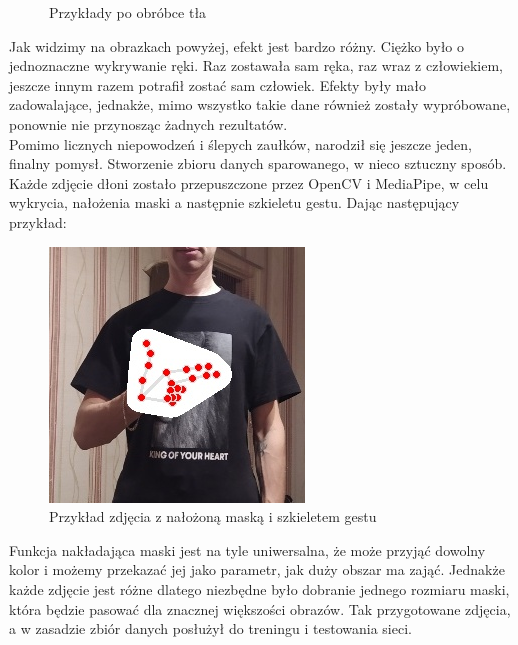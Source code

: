 \documentclass[12pt]{article}
\begin{document}
\begin{sloppypar}
{{\begin{figure}
\begin{subfigure}{.5\textwidth}
        \label{fig:blurred}
      \end{subfigure}
      \caption{Przykłady po obróbce tła}
      \label{fig:blurred-pre}
    \end{figure}
    Jak widzimy na obrazkach powyżej, efekt jest bardzo różny. Ciężko było o jednoznaczne wykrywanie ręki. 
    Raz zostawała sam ręka, raz wraz z człowiekiem, jeszcze innym razem potrafił zostać sam człowiek. 
    Efekty były mało zadowalające, jednakże, mimo wszystko takie dane również zostały wypróbowane, ponownie nie przynosząc żadnych rezultatów. \\
    Pomimo licznych niepowodzeń i ślepych zaułków, narodził się jeszcze jeden, finalny pomysł. Stworzenie zbioru danych sparowanego, w nieco sztuczny sposób.
    Każde zdjęcie dłoni zostało przepuszczone przez OpenCV i MediaPipe, w celu wykrycia, nałożenia maski a następnie szkieletu gestu. Dając następujący przykład:
    \begin{figure}[H]
      \centering
      \includegraphics{no_hand.jpg}
      \caption{Przykład zdjęcia z nałożoną maską i szkieletem gestu}
      \label{fig:mask}
    \end{figure}
    Funkcja nakładająca maski jest na tyle uniwersalna, że może przyjąć dowolny kolor i możemy przekazać jej jako parametr, jak duży obszar ma zająć. 
    Jednakże każde zdjęcie jest różne dlatego niezbędne było dobranie jednego rozmiaru maski, która będzie pasować dla znacznej większości obrazów. 
    Tak przygotowane zdjęcia, a w zasadzie zbiór danych posłużył do treningu i testowania sieci.
  }
}
\end{sloppypar}
\end{document}
